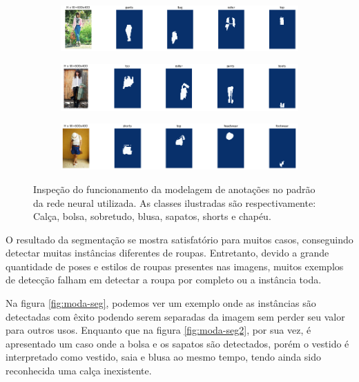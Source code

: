 \documentclass[12pt]{report}
\begin{document}
\begin{figure}
  \centering
  \begin{subfigure}[b]{\textwidth}
  \centering
    \includegraphics[scale=0.8]{images/mask1.png}
    \label{fig:mask1}
  \end{subfigure}
  \centering
  \begin{subfigure}[b]{\textwidth}
  \centering
    \includegraphics[scale=0.8]{images/mask3.png}
    \label{fig:mask3}
  \end{subfigure}
  \centering
  \begin{subfigure}[b]{\textwidth}
  \centering
    \includegraphics[scale=0.8]{images/mask2.png}
    \label{fig:mask2}
  \end{subfigure}
  \caption{Inspeção do funcionamento da modelagem de anotações no padrão da rede neural utilizada. As classes ilustradas são respectivamente: Calça, bolsa, sobretudo, blusa, sapatos, shorts e chapéu.}
  \label{fig:masks}
\end{figure}
 

O resultado da segmentação se mostra satisfatório para muitos casos, conseguindo detectar muitas instâncias diferentes de roupas. Entretanto, devido a grande quantidade de poses e estilos de roupas presentes nas imagens, muitos exemplos de detecção falham em detectar a roupa por completo ou a instância toda.

Na figura \ref{fig:moda-seg}, podemos ver um exemplo onde as instâncias são detectadas com êxito podendo serem separadas da imagem sem perder seu valor para outros usos. Enquanto que na figura \ref{fig:moda-seg2}, por sua vez, é apresentado um caso onde a bolsa e os sapatos são detectados, porém o vestido é interpretado como vestido, saia e blusa ao mesmo tempo, tendo ainda sido reconhecida uma calça inexistente. 
\end{document}
